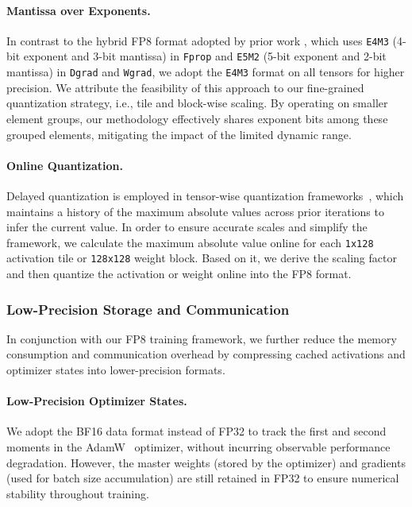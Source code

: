 \paragraph{Mantissa over Exponents.} 
In contrast to the hybrid FP8 format adopted by prior work \citep{transformerengine, fp8lm, hfp8}, which uses \texttt{E4M3} (4-bit exponent and 3-bit mantissa) in \texttt{Fprop} and \texttt{E5M2} (5-bit exponent and 2-bit mantissa) in \texttt{Dgrad} and \texttt{Wgrad}, we adopt the \texttt{E4M3} format on all tensors for higher precision. 
We attribute the feasibility of this approach to our fine-grained quantization strategy, i.e., tile and block-wise scaling. 
By operating on smaller element groups, our methodology effectively shares exponent bits among these grouped elements, mitigating the impact of the limited dynamic range. 

\paragraph{Online Quantization.}
Delayed quantization is employed in tensor-wise quantization frameworks~\citep{transformerengine, fp8lm}, which maintains a history of the maximum absolute values across prior iterations to infer the current value. 
In order to ensure accurate scales and simplify the framework, we calculate the maximum absolute value online for each \texttt{1x128} activation tile or \texttt{128x128} weight block. 
Based on it, we derive the scaling factor and then quantize the activation or weight online into the FP8 format.

\subsubsection{Low-Precision Storage and Communication}
In conjunction with our FP8 training framework, we further reduce the memory consumption and communication overhead by compressing cached activations and optimizer states into lower-precision formats.

\paragraph{Low-Precision Optimizer States.}
We adopt the BF16 data format instead of FP32 to track the first and second moments in the AdamW~\citep{adamW} optimizer, without incurring observable performance degradation. 
However, the master weights (stored by the optimizer) and gradients (used for batch size accumulation) are still retained in FP32 to ensure numerical stability throughout training.

